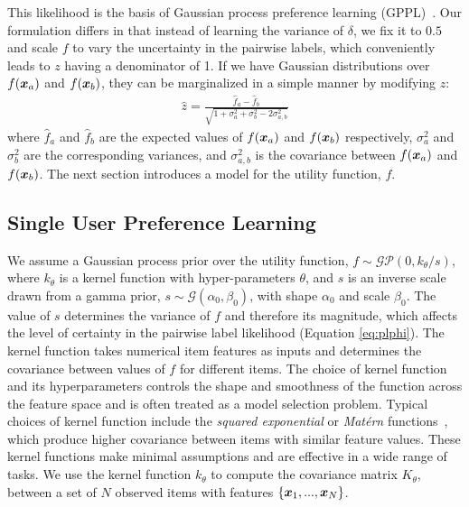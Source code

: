 This likelihood is the basis of Gaussian process preference learning (GPPL)~\citep{chu2005preference}. 
Our formulation differs in that instead of learning the variance of $\delta$, we fix it 
to $0.5$ and scale $f$ to vary the uncertainty in the pairwise labels,
which conveniently leads to $z$ having a denominator of 1.
If we have Gaussian distributions over $f(\boldsymbol x_a)$ and $f(\boldsymbol x_b)$, they can be marginalized in a simple manner %
by modifying $z$:
\begin{align}
\hat{z} = \frac{\hat{f}_a - \hat{f}_b}{\sqrt{1 + \sigma^2_a + \sigma^2_b - 2\sigma^2_{a,b}} } \label{eq:predict_z}
\end{align}
where $\hat{f}_a$ and $\hat{f}_b$ are the expected values of $f(\boldsymbol x_a)$ and $f(\boldsymbol x_b)$ respectively, 
$\sigma^2_a$ and $\sigma^2_b$ are the corresponding variances,
and $\sigma^2_{a,b}$ is the covariance between $f(\boldsymbol x_a)$ and $f(\boldsymbol x_b)$.
The next section introduces a model for the utility function, $f$.

\subsection{Single User Preference Learning}

We assume a Gaussian process prior over the utility function, 
$f \sim \mathcal{GP}(0, k_{\theta}/s)$, where $k_{\theta}$ is a kernel function with hyper-parameters $\theta$, 
and $s$ is an inverse scale drawn from a gamma prior, 
$s \sim \mathcal{G}(\alpha_0, \beta_0)$, with shape $\alpha_0$ and scale $\beta_0$.
The value of $s$ determines the variance of $f$ and therefore its magnitude, which affects the level of certainty
in the pairwise label likelihood (Equation \ref{eq:plphi}).
The kernel function takes numerical item features as inputs and determines the covariance between values of $f$ for different items. 
The choice of kernel function and its hyperparameters controls the shape and smoothness of the function 
across the feature space and is often treated as a model selection problem.
Typical choices of kernel function include the \emph{squared exponential} or \emph{Mat\'ern} functions~\citep{rasmussen_gaussian_2006},
which produce higher covariance between items with similar feature values.
These kernel functions make minimal assumptions and are effective in a wide range of tasks. 
We use the kernel function $k_{\theta}$ to compute the covariance matrix $K_{\theta}$,
between a set of $N$ observed items with features $\{ \boldsymbol x_1, ..., \boldsymbol x_N \}$.


